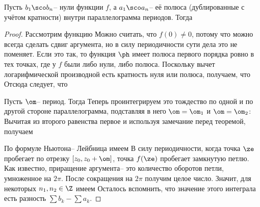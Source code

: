 \documentclass[a4paper]{article}
\begin{document}
\begin{theorem}
Пусть $b_1\sco b_n$-- нули функции $f$, а $a_1\sco a_n$-- её полюса (дублированные
с учётом кратности) внутри параллелограмма периодов. Тогда
\end{theorem}
\begin{proof}
Рассмотрим функцию
Можно считать, что $f(0) \neq 0$, потому что можно всегда сделать сдвиг аргумента, но в силу периодичности
сути дела это не поменяет. Если это так, то функция $\ph$ имеет полюса первого порядка ровно в тех
точках, где у $f$ были либо нули, либо полюса. Поскольку вычет логарифмической производной есть кратность
нуля или полюса, получаем, что
Отсюда следует, что

Пусть $\om$-- период. Тогда
Теперь проинтегрируем это тождество по одной и по другой стороне параллелограмма, подставляя в него
$\om = \om_1$ и $\om = \om_2$:
Вычитая из второго равенства первое и используя замечание перед теоремой, получаем

По формуле Ньютона-- Лейбница имеем
В силу периодичности, когда точка $\ze$ пробегает по отрезку $[z_0,z_0+\om]$, точка $f(\ze)$ пробегает
замкнутую петлю. Как известно, приращение аргумента-- это количество оборотов петли, умноженное на $2\pi$.
После сокращения на $2\pi$ получим целое число. Значит, для некоторых $n_1,n_2\in\Z$ имеем
Осталось вспомнить, что значение этого интеграла есть разность $\sum b_k - \sum a_k$.
\end{proof}
\end{document}
